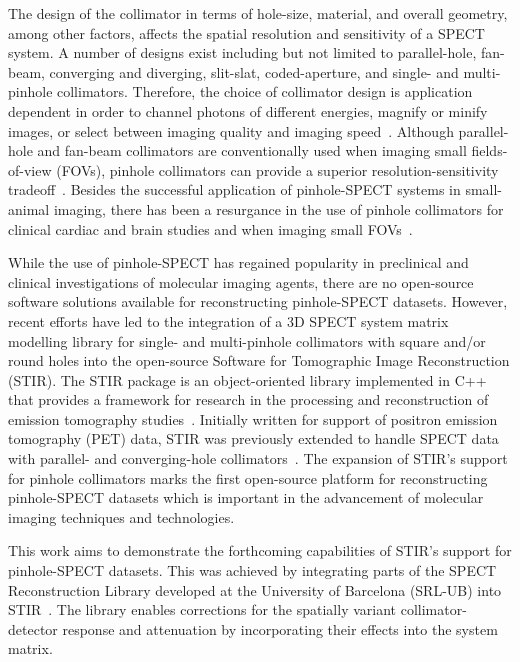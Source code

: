 \documentclass[utf8]{FrontiersinHarvard} %
\begin{document}
The design of the collimator in terms of hole-size, material, and overall geometry, among other factors, affects the spatial resolution and sensitivity of a SPECT system. A number of designs exist including but not limited to parallel-hole, fan-beam, converging and diverging, slit-slat, coded-aperture, and single- and multi-pinhole collimators. Therefore, the choice of collimator design is application dependent in order to channel photons of different energies, magnify or minify images, or select between imaging quality and imaging speed~\cite{nuclearfields.com}. Although parallel-hole and fan-beam collimators are conventionally used when imaging small fields-of-view (FOVs), pinhole collimators can provide a superior resolution-sensitivity tradeoff~\cite{collimators, recall Dr. Mawko's book}. Besides the successful application of pinhole-SPECT systems in small-animal imaging, there has been a resurgance in the use of pinhole collimators for clinical cardiac and brain studies and when imaging small FOVs~\cite{ozashin_clinical_2020}.

While the use of pinhole-SPECT has regained popularity in preclinical and clinical investigations of molecular imaging agents, there are no open-source software solutions available for reconstructing pinhole-SPECT datasets.  However, recent efforts have led to the integration of a 3D SPECT system matrix modelling library for single- and multi-pinhole collimators with square and/or round holes into the open-source Software for Tomographic Image Reconstruction (STIR). The STIR package is an object-oriented library implemented in C++ that provides a framework for research in the processing and reconstruction of emission tomography studies~\cite{thielemans_stir_2012}. Initially written for support of positron emission tomography (PET) data, STIR was previously extended to handle SPECT data with parallel- and converging-hole collimators~\cite{fuster_integration_2013a, fuster_integration_2013b}. The expansion of STIR's support for pinhole collimators marks the first open-source platform for reconstructing pinhole-SPECT datasets which is important in the advancement of molecular imaging techniques and technologies. 


This work aims to demonstrate the forthcoming capabilities of STIR's support for pinhole-SPECT datasets. This was achieved by integrating parts of the SPECT Reconstruction Library developed at the University of Barcelona (SRL-UB) into STIR~\cite{Refs. 2-5 in SPECTUB}. The library enables corrections for the spatially variant collimator-detector response and attenuation by incorporating their effects into the system matrix.
\end{document}
